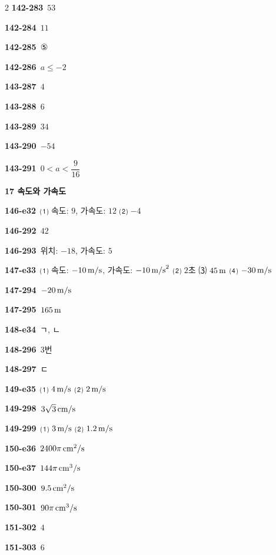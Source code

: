 \documentclass[10pt,a4paper]{article}
\begin{document}
\begin{multicols}{2}
\noindent\textbf{142-283}\ $53$\par
\noindent\textbf{142-284}\ $11$\par
\noindent\textbf{142-285}\ ⑤\par
\noindent\textbf{142-286}\ $a\le -2$\par
\noindent\textbf{143-287}\ $4$\par
\noindent\textbf{143-288}\ $6$\par
\noindent\textbf{143-289}\ $34$\par
\noindent\textbf{143-290}\ $-54$\par
\noindent\textbf{143-291}\ $0<a<\dfrac{9}{16}$\par
\noindent\textbf{17 속도와 가속도}\par\smallskip
\noindent\textbf{146-e32}\ ⑴ 속도: $9$, 가속도: $12$ ⑵ $-4$\par
\noindent\textbf{146-292}\ $42$\par
\noindent\textbf{146-293}\ 위치: $-18$, 가속도: $5$\par
\noindent\textbf{147-e33}\ ⑴ 속도: $-10\mkern3mu \mathrm{m/s}$, 가속도: $-10\mkern3mu \mathrm{m/s}^2$ ⑵ $2$초 ⑶ $45\mkern3mu \mathrm{m}$ ⑷ $-30\mkern3mu \mathrm{m/s}$\par
\noindent\textbf{147-294}\ $-20\mkern3mu \mathrm{m/s}$\par
\noindent\textbf{147-295}\ $165\mkern3mu \mathrm{m}$\par
\noindent\textbf{148-e34}\ ㄱ, ㄴ\par
\noindent\textbf{148-296}\ $3$번\par
\noindent\textbf{148-297}\ ㄷ\par
\noindent\textbf{149-e35}\ ⑴ $4\mkern3mu \mathrm{m/s}$ ⑵ $2\mkern3mu \mathrm{m/s}$\par
\noindent\textbf{149-298}\ $3\sqrt{3}\mkern3mu \mathrm{cm/s}$\par
\noindent\textbf{149-299}\ ⑴ $3\mkern3mu \mathrm{m/s}$ ⑵ $1.2\mkern3mu \mathrm{m/s}$\par
\noindent\textbf{150-e36}\ $2400\pi\mkern3mu \mathrm{cm}^2/\mathrm{s}$\par
\noindent\textbf{150-e37}\ $144\pi\mkern3mu \mathrm{cm}^3/\mathrm{s}$\par
\noindent\textbf{150-300}\ $9.5\mkern3mu \mathrm{cm}^2/\mathrm{s}$\par
\noindent\textbf{150-301}\ $90\pi\mkern3mu \mathrm{cm}^3/\mathrm{s}$\par
\noindent\textbf{151-302}\ $4$\par
\noindent\textbf{151-303}\ $6$\par

\end{multicols}
\end{document}
